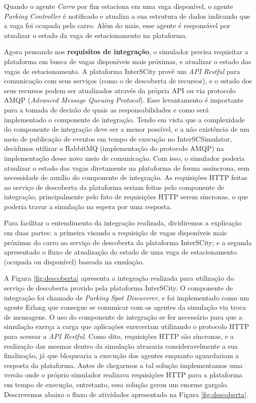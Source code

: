 Quando o agente \textit{Carro} por fim estaciona em uma vaga disponível, o agente \textit{Parking Controller} é notificado e atualiza a sua estrutura de dados indicando
que a vaga foi ocupada pelo carro.
Além do mais, esse agente é responsável por atualizar o estado da vaga de estacionamento na plataforma.

Agora pensando nos \textbf{requisitos de integração}, o simulador precisa requisitar a plataforma em busca de vagas disponíveis mais próximas, e atualizar o estado
das vagas de estacionamento.
A plataforma InterSCity provê um \textit{API Restful} para comunicação com seus serviços (como o de descoberta de recursos), e o estado dos seus recursos podem ser
atualizados através da própria API ou via protocolo AMQP (\textit{Advanced Message Queuing Protocol}).
Esse levantamento é importante para a tomada de decisão de quais as responsabilidades e como será implementado o componente de integração.
Tendo em vista que a complexidade do componente de integração deve ser a menor possível, e a não existência de um meio de publicação de eventos em tempo de execução
no InterSCSimulator, decidimos utilizar o RabbitMQ (implementação do protocolo AMQP) na implementação desse novo meio de comunicação.
Com isso, o simulador poderia atualizar o estado das vagas diretamente na plataforma de forma assíncrona, sem necessidade de auxílio do componente de integração.
As requisições HTTP feitas ao serviço de descoberta da plataforma seriam feitas pelo componente de integração, principalmente pelo fato de requisições HTTP serem
síncronas, o que poderia travar a simulação na espera por uma resposta.

Para facilitar o entendimento da integração realizada, dividiremos a explicação em duas partes: a primeira visando a requisição de vagas disponíveis mais próximas
do carro ao serviço de descoberta da plataforma InterSCity; e a segunda apresentado o fluxo de atualização do estado de uma vaga de estacionamento (ocupada
ou disponível) baseada na emulação.

A Figura \ref{fig:descoberta} apresenta a integração realizada para utilização do serviço de descoberta provido pela plataforma InterSCity.
O componente de integração foi chamado de \textit{Parking Spot Discoverer}, e foi implementado como um agente Erlang que consegue se comunicar com os agentes da
simulação via troca de mensagens.
O uso do componente de integração se fez necessário para que a simulação exerça a carga que aplicações exerceriam utilizando o protocolo HTTP para acessar
a \textit{API Restful}.
Como dito, requisições HTTP são síncronas, e a realização das mesmas dentro da simulação atrasaria consideravelmente a sua finalização, já que bloquearia a
execução dos agentes enquanto aguardariam a resposta da plataforma.
Antes de chegarmos a tal solução implementamos uma versão onde o próprio simulador realizava requisições HTTP para a plataforma em tempo de execução, entretanto,
essa solução gerou um enorme gargalo.
Descrevemos abaixo o fluxo de atividades apresentado na Figura \ref{fig:descoberta}.

